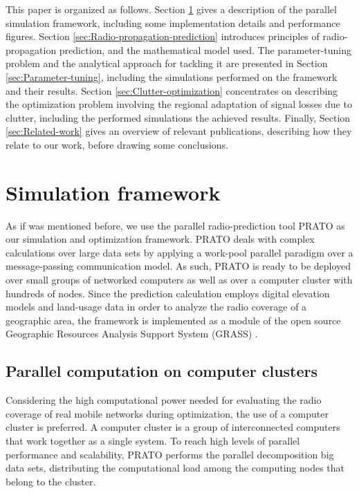 This paper is organized as follows. Section \ref{sec:Simulation-framework}
gives a description of the parallel simulation framework, including
some implementation details and performance figures. Section \ref{sec:Radio-propagation-prediction}
introduces principles of radio-propagation prediction, and the mathematical
model used. The parameter-tuning problem and the analytical approach
for tackling it are presented in Section \ref{sec:Parameter-tuning},
including the simulations performed on the framework and their results.
Section \ref{sec:Clutter-optimization} concentrates on describing
the optimization problem involving the regional adaptation of signal
losses due to clutter, including the performed simulations the achieved
results. Finally, Section \ref{sec:Related-work} gives an overview
of relevant publications, describing how they relate to our work,
before drawing some conclusions.


\section{Simulation framework}\label{sec:Simulation-framework}

As if was mentioned before, we use the parallel radio-prediction tool
PRATO \cite{Benedicic-A_GRASS_GIS_parallel_module_for_radio-propagation_predictions:2013}
as our simulation and optimization framework. PRATO deals with complex
calculations over large data sets by applying a work-pool parallel
paradigm over a message-passing communication model. As such, PRATO
is ready to be deployed over small groups of networked computers as
well as over a computer cluster with hundreds of nodes. Since the
prediction calculation employs digital elevation models and land-usage
data in order to analyze the radio coverage of a geographic area,
the framework is implemented as a module of the open source Geographic
Resources Analysis Support System (GRASS) \cite{Neteler_Open_source_GIS_a_GRASS_GIS_approach}.


\subsection{Parallel computation on computer clusters}

Considering the high computational power needed for evaluating the
radio coverage of real mobile networks during optimization, the use
of a computer cluster is preferred. A computer cluster is a group
of interconnected computers that work together as a single system.
To reach high levels of parallel performance and scalability, PRATO
performs the parallel decomposition big data sets, distributing the
computational load among the computing nodes that belong to the cluster.

